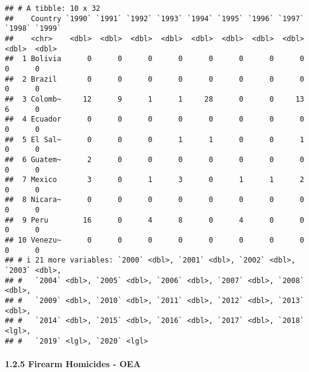 \documentclass[
  11pt,
]{article}
\begin{document}
\begin{verbatim}
## # A tibble: 10 x 32
##    Country `1990` `1991` `1992` `1993` `1994` `1995` `1996` `1997` `1998` `1999`
##    <chr>    <dbl>  <dbl>  <dbl>  <dbl>  <dbl>  <dbl>  <dbl>  <dbl>  <dbl>  <dbl>
##  1 Bolivia      0      0      0      0      0      0      0      0      0      0
##  2 Brazil       0      0      0      0      0      0      0      0      0      0
##  3 Colomb~     12      9      1      1     28      0      0     13      6      0
##  4 Ecuador      0      0      0      0      0      0      0      0      0      0
##  5 El Sal~      0      0      0      1      1      0      0      1      0      0
##  6 Guatem~      2      0      0      0      0      0      0      0      0      0
##  7 Mexico       3      0      1      3      0      1      1      2      0      0
##  8 Nicara~      0      0      0      0      0      0      0      0      0      0
##  9 Peru        16      0      4      8      0      4      0      0      0      0
## 10 Venezu~      0      0      0      0      0      0      0      0      0      0
## # i 21 more variables: `2000` <dbl>, `2001` <dbl>, `2002` <dbl>, `2003` <dbl>,
## #   `2004` <dbl>, `2005` <dbl>, `2006` <dbl>, `2007` <dbl>, `2008` <dbl>,
## #   `2009` <dbl>, `2010` <dbl>, `2011` <dbl>, `2012` <dbl>, `2013` <dbl>,
## #   `2014` <dbl>, `2015` <dbl>, `2016` <dbl>, `2017` <dbl>, `2018` <lgl>,
## #   `2019` <lgl>, `2020` <lgl>
\end{verbatim}

\paragraph{1.2.5 Firearm Homicides - OEA}\label{firearm-homicides---oea}
\end{document}
